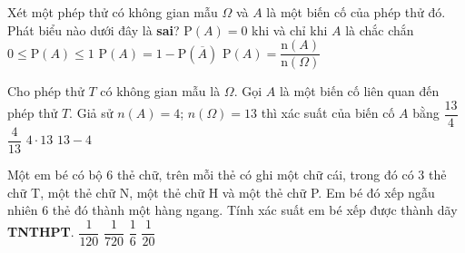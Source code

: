 

\begin{ex}%
	Xét một phép thử có không gian mẫu $\Omega$ và $A$ là một biến cố của phép thử đó.  Phát biểu nào dưới đây là \textbf{sai}?
	\choice 
		{\True $\mathrm{P}(A)=0$ khi và  chỉ khi $A$ là chắc chắn}
		{$0 \leq \mathrm{P}(A)  \leq 1$}
		{$\mathrm{P}(A)=1-\mathrm{P}\left(  \overline{A}\right) $}
		{$\mathrm{P}(A)=\dfrac{\mathrm{n} (A)}{\mathrm{n} (\Omega)}$} 
\end{ex}

\begin{ex}%
	Cho  phép thử $T$ có không gian mẫu là $\Omega$. Gọi $A$ là một biến cố liên quan đến phép thử $T$. Giả sử $n(A) = 4$; $n(\Omega) = 13$ thì xác suất của biến cố $A$ bằng
	\choice 
		{$\dfrac{13}{4}$} 
		{\True $\dfrac{4}{13}$} 
		{$4\cdot  13$}
		 {$13-4$}
\end{ex}

\begin{ex}%
	Một em bé có bộ $6$ thẻ chữ, trên mỗi thẻ có ghi một chữ cái, trong đó có $3$ thẻ chữ T, một thẻ chữ N, một thẻ chữ H và một thẻ chữ P. Em bé đó xếp ngẫu nhiên $6$ thẻ đó thành một hàng ngang. Tính xác suất em bé xếp được thành  dãy \textbf{TNTHPT}.
	 \choice
		{\True $\dfrac{1}{120}$} 
		{$\dfrac{1}{720}$} 
		{$\dfrac{1}{6}$} 
		{$\dfrac{1}{20}$} 
\end{ex}


